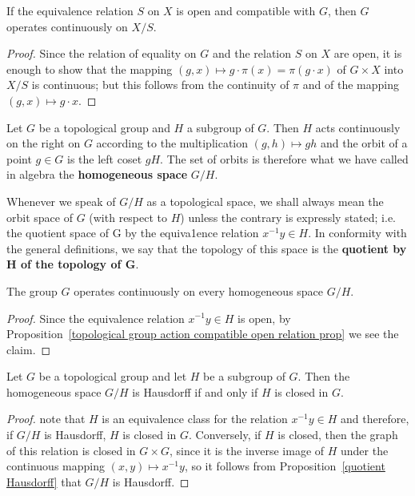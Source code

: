 \begin{proposition}\label{topological group action compatible open relation prop}
If the equivalence relation $S$ on $X$ is open and compatible with $G$, then $G$ operates continuously on $X/S$.
\end{proposition}
\begin{proof}
Since the relation of equality on $G$ and the relation $S$ on $X$ are open, it is enough to show that the mapping $(g,x)\mapsto g\cdot\pi(x)=\pi(g\cdot x)$ of $G\times X$ into $X/S$ is continuous; but this follows from the continuity of $\pi$ and of the mapping $(g,x)\mapsto g\cdot x$.
\end{proof}
Let $G$ be a topological group and $H$ a subgroup of $G$. Then $H$ acts continuously on the right on $G$ according to the multiplication $(g,h)\mapsto gh$ and the orbit of a point $g\in G$ is the left coset $gH$. The set of orbits is therefore what we have called in algebra the \textbf{homogeneous space} $G/H$.\par
Whenever we speak of $G/H$ as a topological space, we shall always mean the orbit space of $G$ (with respect to $H$) unless the contrary is expressly stated; i.e. the quotient space of G by the equiva1ence relation $x^{-1}y\in H$. In conformity with the general definitions, we say that the topology of this space is the \textbf{quotient by $\bm{H}$ of the topology of $\bm{G}$}.
\begin{proposition}
The group $G$ operates continuously on every homogeneous space $G/H$.
\end{proposition}
\begin{proof}
Since the equivalence relation $x^{-1}y\in H$ is open, by Proposition~\ref{topological group action compatible open relation prop} we see the claim.
\end{proof}
\begin{proposition}\label{topological group coset space Hausdorff iff}
Let $G$ be a topological group and let $H$ be a subgroup of $G$. Then the homogeneous space $G/H$ is Hausdorff if and only if $H$ is closed in $G$.
\end{proposition}
\begin{proof}
note that $H$ is an equivalence class for the relation $x^{-1}y\in H$ and therefore, if $G/H$ is Hausdorff, $H$ is closed in $G$. Conversely, if $H$ is closed, then the graph of this relation is closed in $G\times G$, since it is the inverse image of $H$ under the continuous mapping $(x,y)\mapsto x^{-1}y$, so it follows from Proposition~\ref{quotient Hausdorff} that $G/H$ is Hausdorff.
\end{proof}
